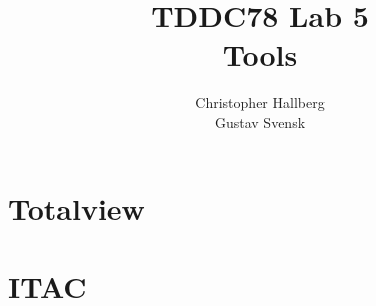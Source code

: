 \documentclass[a4paper, 12pt]{article}
\begin{document}
\title{TDDC78 Lab 5\\
        Tools }
\author{Christopher Hallberg \\
        Gustav Svensk}
\maketitle

\thispagestyle{empty}

\newpage
\setcounter{page}{1}
\tableofcontents
\newpage

\section{Totalview}
\section{ITAC}
\end{document}
